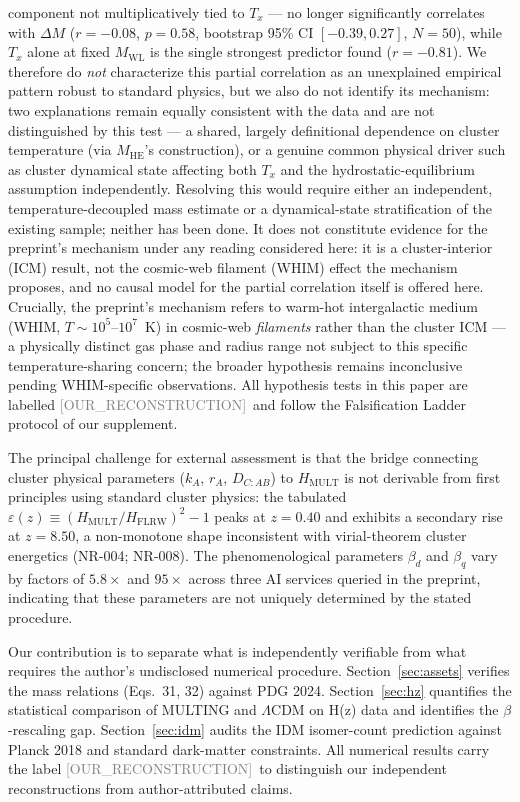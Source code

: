 \documentclass[twocolumn,prd,amsmath,amssymb,floatfix]{revtex4-2}
\newcommand{\reconstruction}{\textcolor{gray}{\small[OUR\_RECONSTRUCTION]}}
\begin{document}
component not multiplicatively tied to $T_x$ --- no longer significantly
correlates with $\Delta M$ ($r=-0.08$, $p=0.58$, bootstrap 95\% CI
$[-0.39,0.27]$, $N=50$), while $T_x$ alone at fixed $M_\mathrm{WL}$ is the
single strongest predictor found ($r=-0.81$). We therefore do
\emph{not} characterize this partial correlation as an unexplained empirical
pattern robust to standard physics, but we also do not identify its mechanism:
two explanations remain equally consistent with the data and are not
distinguished by this test --- a shared, largely definitional dependence on
cluster temperature (via $M_\mathrm{HE}$'s construction), or a genuine common
physical driver such as cluster dynamical state affecting both $T_x$ and the
hydrostatic-equilibrium assumption independently. Resolving this would require
either an independent, temperature-decoupled mass estimate or a
dynamical-state stratification of the existing sample; neither has been done.
It does not constitute evidence for the preprint's mechanism under any reading
considered here: it is a cluster-interior (ICM) result, not the cosmic-web
filament (WHIM) effect the mechanism proposes, and no causal model for the
partial correlation itself is offered here. Crucially, the preprint's
mechanism refers to warm-hot
intergalactic medium (WHIM, $T\sim 10^5$--$10^7$~K) in cosmic-web
\emph{filaments} rather than the cluster ICM --- a physically distinct gas
phase and radius range not subject to this specific temperature-sharing
concern; the broader hypothesis remains inconclusive pending WHIM-specific
observations.
All hypothesis tests in this paper are labelled \reconstruction\ and follow
the Falsification Ladder protocol of our supplement.

The principal challenge for external assessment is that the bridge connecting
cluster physical parameters ($k_A$, $r_A$, $D_{C:AB}$) to $H_\mathrm{MULT}$
is not derivable from first principles using standard cluster physics: the
tabulated $\varepsilon(z) \equiv (H_\mathrm{MULT}/H_\mathrm{FLRW})^2 - 1$
peaks at $z = 0.40$ and exhibits a secondary rise at $z = 8.50$, a
non-monotone shape inconsistent with virial-theorem cluster energetics (NR-004;
NR-008).  The phenomenological parameters $\beta_d$ and $\beta_q$ vary by
factors of $5.8\times$ and $95\times$ across three AI services queried in the
preprint, indicating that these parameters are not uniquely determined by the
stated procedure.

Our contribution is to separate what is independently verifiable from what
requires the author's undisclosed numerical procedure.
Section~\ref{sec:assets} verifies the mass relations (Eqs.~31, 32) against
PDG 2024.
Section~\ref{sec:hz} quantifies the statistical comparison of MULTING and
$\Lambda$CDM on H(z) data and identifies the $\beta$-rescaling gap.
Section~\ref{sec:idm} audits the IDM isomer-count prediction against Planck
2018 and standard dark-matter constraints.
All numerical results carry the label \reconstruction\ to distinguish our
independent reconstructions from author-attributed claims.
\end{document}
